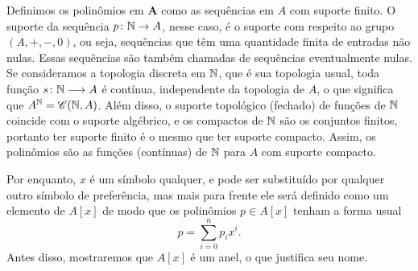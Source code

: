 Definimos os polinômios em $\bm A$ como as sequências em $A$ com suporte finito. O suporte da sequência $p\colon \mathbb{N} \to A$, nesse caso, é o suporte com respeito ao grupo $(A,+,-,0)$, ou seja, sequências que têm uma quantidade finita de entradas não nulas. Essas sequências são também chamadas de sequências eventualmente nulas. Se consideramos a topologia discreta em $\mathbb{N}$, que é sua topologia usual, toda função ${s}\colon {\mathbb{N}} \longrightarrow {A}$ é contínua, independente da topologia de $A$, o que significa que $A^{\mathbb{N}} = \mathscr{C}(\mathbb{N},A)$. Além disso, o suporte topológico (fechado) de funções de $\mathbb{N}$ coincide com o suporte algébrico, e os compactos de $\mathbb{N}$ são os conjuntos finitos, portanto ter suporte finito é o mesmo que ter suporte compacto. Assim, os polinômios são as funções (contínuas) de $\mathbb{N}$ para $A$ com suporte compacto.

Por enquanto, $x$ é um símbolo qualquer, e pode ser substituído por qualquer outro símbolo de preferência, mas mais para frente ele será definido como um elemento de $A[x]$ de modo que os polinômios $p \in A[x]$ tenham a forma usual
	\begin{equation*}
	p = \sum_{i=0}^{n} p_i x^i.
	\end{equation*}
Antes disso, mostraremos que $A[x]$ é um anel, o que justifica seu nome.

%

